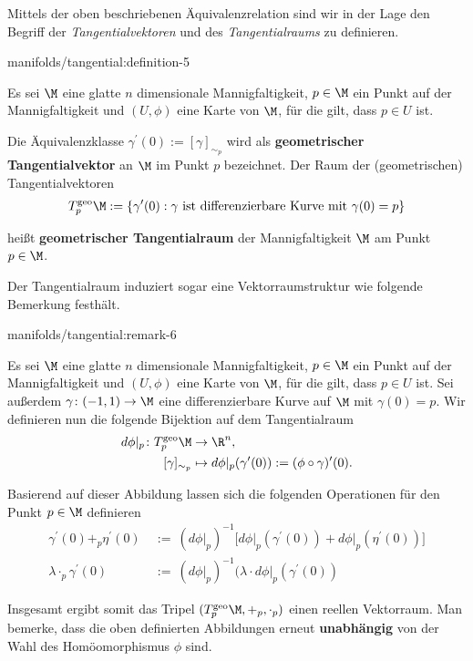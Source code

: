 \documentclass[letterpaper,10pt,german]{jupyterBook}
\begin{document}
\par
Mittels der oben beschriebenen Äquivalenzrelation sind wir in der Lage den Begriff der \emph{Tangentialvektoren} und des \emph{Tangentialraums} zu definieren.
\begin{definition}{}{manifolds/tangential:definition-5}



\par
Es sei \(\M\) eine glatte \(n\) dimensionale Mannigfaltigkeit, \(p\in\M\) ein Punkt auf der Mannigfaltigkeit und \((U,\phi)\) eine Karte von \(\M\), für die gilt, dass \(p\in U\) ist.

\par
Die Äquivalenzklasse \(\gamma^\prime(0):=[\gamma]_{\sim_p}\) wird als \textbf{geometrischer Tangentialvektor} an \(\M\) im Punkt \(p\) bezeichnet.
Der Raum der (geometrischen) Tangentialvektoren
\begin{align*}
T_p^{\text{geo}}\M := \{\gamma^\prime(0): \gamma\text{ ist differenzierbare Kurve mit }\gamma(0)=p\}
\end{align*}
\par
heißt \textbf{geometrischer Tangentialraum} der Mannigfaltigkeit \(\M\) am Punkt \(p \in \M\).
\end{definition}

\par
Der Tangentialraum induziert sogar eine Vektorraumstruktur wie folgende Bemerkung festhält.
\begin{remark}{}{manifolds/tangential:remark-6}



\par
Es sei \(\M\) eine glatte \(n\) dimensionale Mannigfaltigkeit, \(p\in\M\) ein Punkt auf der Mannigfaltigkeit und \((U,\phi)\) eine Karte von \(\M\), für die gilt, dass \(p\in U\) ist.
Sei außerdem \(\gamma \colon (-1,1) \rightarrow \M\) eine differenzierbare Kurve auf \(\M\) mit \(\gamma(0) = p\).
Wir definieren nun die folgende Bijektion auf dem Tangentialraum
\begin{align*}
d\phi\rvert_p \colon T^{\text{geo}}_p\M &\rightarrow \R^n,\\
[\gamma]_{\sim_p} &\mapsto d\phi\rvert_p (\gamma^\prime(0)) := (\phi \circ \gamma)^\prime (0).
\end{align*}
\par
Basierend auf dieser Abbildung lassen sich die folgenden Operationen für den Punkt \(p \in \M\) definieren
\begin{align*}
\gamma^\prime(0) +_{p} \eta^\prime(0) \ &:= \
(d\phi\rvert_p)^{-1}\big[d\phi\rvert_p(\gamma^\prime(0)) + d\phi\rvert_p(\eta^\prime(0))\big]\\
\lambda \cdot_p \gamma^\prime(0) \ &:= \ (d\phi\rvert_p)^{-1} (\lambda \cdot d\phi\rvert_p(\gamma^\prime(0))
\end{align*}
\par
Insgesamt ergibt somit das Tripel \((T_p^{\text{geo}}\M, +_p, \cdot_p)\) einen reellen Vektorraum.
Man bemerke, dass die oben definierten Abbildungen erneut \textbf{unabhängig} von der Wahl des Homöomorphismus \(\phi\) sind.
\end{remark}
\end{document}
